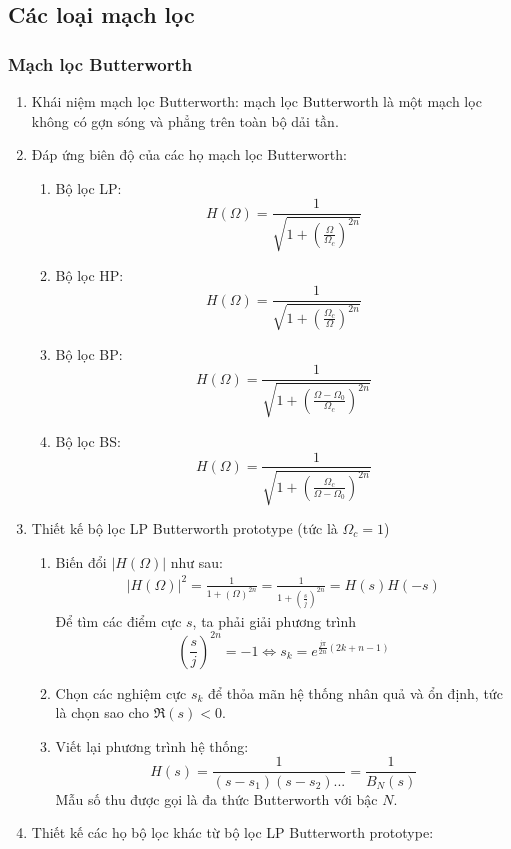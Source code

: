 \documentclass{article}
\begin{document}
\subsection{Các loại mạch lọc}
\subsubsection{Mạch lọc Butterworth}
\begin{enumerate}
\item Khái niệm mạch lọc Butterworth: mạch lọc Butterworth là một mạch lọc không có gợn sóng và phẳng trên toàn bộ dải tần.
\item Đáp ứng biên độ của các họ mạch lọc Butterworth:
  \begin{enumerate}
    \item Bộ lọc LP: $$H(\Omega)=\frac{1}{\sqrt{1+\left(\frac{\Omega}{\Omega_{c}}\right)^{2n}}}$$
    \item Bộ lọc HP: $$H(\Omega)=\frac{1}{\sqrt{1+\left(\frac{\Omega_{c}}{\Omega}\right)^{2n}}}$$
    \item Bộ lọc BP: $$H(\Omega)=\frac{1}{\sqrt{1+\left(\frac{\Omega-\Omega_{0}}{\Omega_{c}}\right)^{2n}}}$$
    \item Bộ lọc BS: $$H(\Omega)=\frac{1}{\sqrt{1+\left(\frac{\Omega_{c}}{\Omega-\Omega_{0}}\right)^{2n}}}$$
  \end{enumerate}
  \item Thiết kế bộ lọc LP Butterworth prototype (tức là $\Omega_{c}=1$)
    \begin{enumerate}
      \item Biến đổi $|H(\Omega)|$ như sau:
      \begin{equation*}
        \begin{split}
          |H(\Omega)|^2=\frac{1}{1+\left(\Omega\right)^{2n}}=\frac{1}{1+\left(\frac{s}{j}\right)^{2n}}=H(s)H(-s)
        \end{split}
      \end{equation*}
      Để tìm các điểm cực $s$, ta phải giải phương trình $$\left(\frac{s}{j}\right)^{2n}=-1 \Leftrightarrow s_{k}=e^{\frac{j\pi}{2n}(2k+n-1)}$$
      \item Chọn các nghiệm cực $s_{k}$ để thỏa mãn hệ thống nhân quả và ổn định, tức là chọn sao cho $\Re(s)<0$.
      \item Viết lại phương trình hệ thống:$$H(s)=\frac{1}{(s-s_{1})(s-s_{2})...}=\frac{1}{B_{N}(s)}$$
      Mẫu số thu được gọi là đa thức Butterworth với bậc $N$.
    \end{enumerate}
    \item Thiết kế các họ bộ lọc khác từ bộ lọc LP Butterworth prototype:

\end{enumerate}
\end{document}
